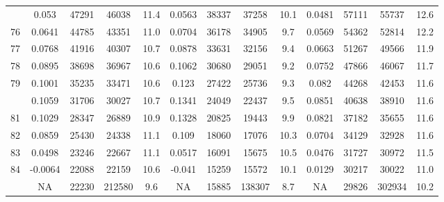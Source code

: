 \documentclass[
  14pt,
]{article}
\begin{document}
\begin{longtable}[t]{lcccccccccccc}
\addlinespace
75 & 0.053 & 47291 & 46038 & 11.4 & 0.0563 & 38337 & 37258 & 10.1 & 0.0481 & 57111 & 55737 & 12.6\\
76 & 0.0641 & 44785 & 43351 & 11.0 & 0.0704 & 36178 & 34905 & 9.7 & 0.0569 & 54362 & 52814 & 12.2\\
77 & 0.0768 & 41916 & 40307 & 10.7 & 0.0878 & 33631 & 32156 & 9.4 & 0.0663 & 51267 & 49566 & 11.9\\
78 & 0.0895 & 38698 & 36967 & 10.6 & 0.1062 & 30680 & 29051 & 9.2 & 0.0752 & 47866 & 46067 & 11.7\\
79 & 0.1001 & 35235 & 33471 & 10.6 & 0.123 & 27422 & 25736 & 9.3 & 0.082 & 44268 & 42453 & 11.6\\
\addlinespace
80 & 0.1059 & 31706 & 30027 & 10.7 & 0.1341 & 24049 & 22437 & 9.5 & 0.0851 & 40638 & 38910 & 11.6\\
81 & 0.1029 & 28347 & 26889 & 10.9 & 0.1328 & 20825 & 19443 & 9.9 & 0.0821 & 37182 & 35655 & 11.6\\
82 & 0.0859 & 25430 & 24338 & 11.1 & 0.109 & 18060 & 17076 & 10.3 & 0.0704 & 34129 & 32928 & 11.6\\
83 & 0.0498 & 23246 & 22667 & 11.1 & 0.0517 & 16091 & 15675 & 10.5 & 0.0476 & 31727 & 30972 & 11.5\\
84 & -0.0064 & 22088 & 22159 & 10.6 & -0.041 & 15259 & 15572 & 10.1 & 0.0129 & 30217 & 30022 & 11.0\\
\addlinespace
85 & NA & 22230 & 212580 & 9.6 & NA & 15885 & 138307 & 8.7 & NA & 29826 & 302934 & 10.2\\*
\end{longtable}
\end{document}
